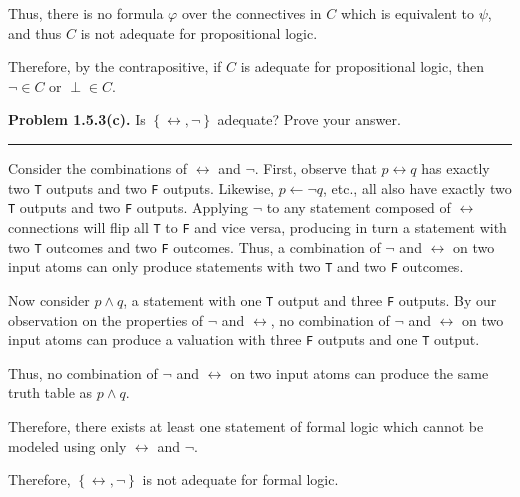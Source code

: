 \documentclass{article}
\begin{document}
Thus, there is no formula $\varphi$ over the connectives in $C$ which is
equivalent to $\psi$, and thus $C$ is not adequate for propositional logic.

Therefore, by the contrapositive, if $C$ is adequate for propositional logic,
then $\lnot \in C$ or $\perp \in C$.

\newpage{}

\noindent\textbf{Problem 1.5.3(c).} Is $\left\{ \leftrightarrow, \lnot \right\}$
adequate? Prove your answer.

\vspace{0.2cm}
\hrule{}
\vspace{0.2cm}

Consider the combinations of $\leftrightarrow$ and $\lnot$. First, observe that
$p \leftrightarrow q$ has exactly two \verb|T| outputs and two \verb|F| outputs.
Likewise, $p \leftarrow \lnot q$, etc., all also have exactly two \verb|T|
outputs and two \verb|F| outputs. Applying $\lnot$ to any statement composed
of $\leftrightarrow$ connections will flip all \verb|T| to \verb|F| and vice
versa, producing in turn a statement with two \verb|T| outcomes and two
\verb|F| outcomes. Thus, a combination of $\lnot$ and $\leftrightarrow$ on
two input atoms can only produce statements with two \verb|T| and two
\verb|F| outcomes.

Now consider $p \wedge q$, a statement with one \verb|T| output and three
\verb|F| outputs. By our observation on the properties of $\lnot$ and
$\leftrightarrow$, no combination of $\lnot$ and $\leftrightarrow$ on two
input atoms can produce a valuation with three \verb|F| outputs and one
\verb|T| output.

Thus, no combination of $\lnot$ and $\leftrightarrow$ on two input atoms
can produce the same truth table as $p \wedge q$.

Therefore, there exists at least one statement of formal logic which cannot
be modeled using only $\leftrightarrow$ and $\lnot$.

Therefore, $\left\{ \leftrightarrow, \lnot \right\}$ is not adequate for
formal logic.
\end{document}
